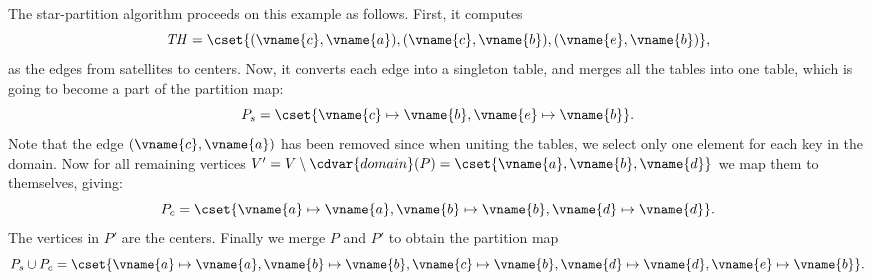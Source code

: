 \begin{group}
\begin{example}
The  star-partition algorithm proceeds on this example as follows.
%
First, it computes
%
\[
\mathit{TH} =
\cset{(\vname{c},\vname{a}),(\vname{c},\vname{b}),(\vname{e},\vname{b})},
\]
%
as the edges from satellites to centers.  
%
Now, it
converts each edge into a singleton table, and merges all the tables
into one
table, which is going to become a part of the partition map:
%
\[
P_s = \cset{\vname{c} \mapsto \vname{b},\vname{e} \mapsto \vname{b}}.
\]
%
Note that the edge $(\vname{c},\vname{a})$ has been removed since when
uniting the tables, we select only one element for each key in the
domain.  
%
Now for all remaining vertices
%
$V' = V \setminus \cdvar{domain}(P) = \cset{\vname{a},\vname{b},\vname{d}}$
we map them to themselves, giving:
%
\[
P_c = \cset{\vname{a} \mapsto \vname{a}, \vname{b} \mapsto \vname{b},
  \vname{d} \mapsto \vname{d}}.
\]
%
The vertices in $P'$ are the centers.
%
Finally we merge $P$ and $P'$ to obtain the partition map
%
\[
P_s \cup P_c = \cset{\vname{a} \mapsto \vname{a}, \vname{b} \mapsto \vname{b}, \vname{c} \mapsto \vname{b}, \vname{d} \mapsto
    \vname{d}, \vname{e} \mapsto \vname{b}}.
\]
\end{example}
\end{group}






